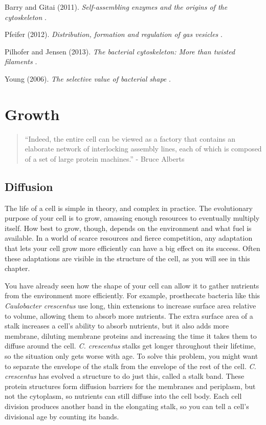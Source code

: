 \documentclass[]{tufte-book}
\begin{document}
Barry and Gitai (2011). \emph{Self-assembling enzymes and the origins of
the cytoskeleton} \citep{barry2011}.

Pfeifer (2012). \emph{Distribution, formation and regulation of gas
vesicles} \citep{pfeifer2012}.

Pilhofer and Jensen (2013). \emph{The bacterial cytoskeleton: More than
twisted filaments} \citep{pilhofer2013}.

Young (2006). \emph{The selective value of bacterial shape}
\citep{young2006}.

\chapter{Growth}\label{growth}

\begin{quote}
``Indeed, the entire cell can be viewed as a factory that contains an
elaborate network of interlocking assembly lines, each of which is
composed of a set of large protein machines.'' - Bruce Alberts
\citep{alberts1998}
\end{quote}

\section{Diffusion}\label{diffusion}

The life of a cell is simple in theory, and complex in practice. The
evolutionary purpose of your cell is to grow, amassing enough resources
to eventually multiply itself. How best to grow, though, depends on the
environment and what fuel is available. In a world of scarce resources
and fierce competition, any adaptation that lets your cell grow more
efficiently can have a big effect on its success. Often these
adaptations are visible in the structure of the cell, as you will see in
this chapter.

You have already seen how the shape of your cell can allow it to gather
nutrients from the environment more efficiently. For example,
prosthecate bacteria like this \emph{Caulobacter crescentus} use long,
thin extensions to increase surface area relative to volume, allowing
them to absorb more nutrients. The extra surface area of a stalk
increases a cell's ability to absorb nutrients, but it also adds more
membrane, diluting membrane proteins and increasing the time it takes
them to diffuse around the cell. \emph{C. crescentus} stalks get longer
throughout their lifetime, so the situation only gets worse with age. To
solve this problem, you might want to separate the envelope of the stalk
from the envelope of the rest of the cell. \emph{C. crescentus} has
evolved a structure to do just this, called a stalk band. These protein
structures form diffusion barriers for the membranes and periplasm, but
not the cytoplasm, so nutrients can still diffuse into the cell body.
Each cell division produces another band in the elongating stalk, so you
can tell a cell's divisional age by counting its bands.
\end{document}
